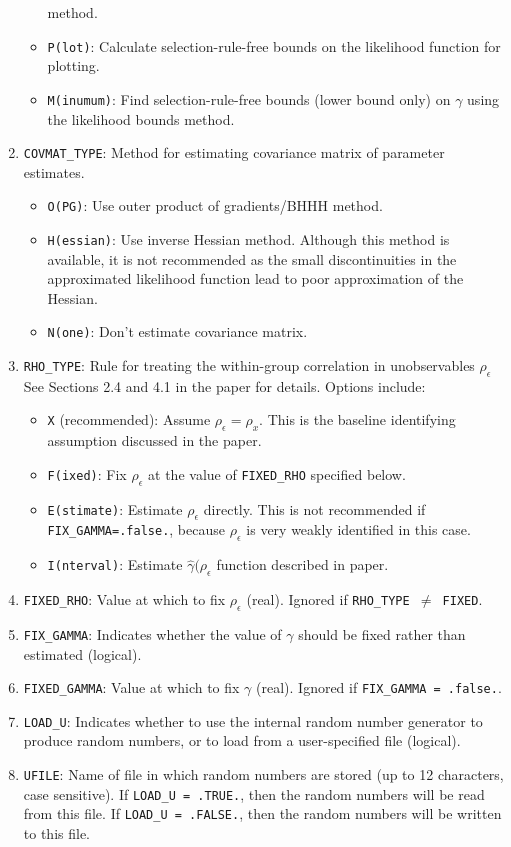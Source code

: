 \documentclass{article}
\begin{document}
\begin{enumerate}
\begin{itemize}
			method.
		\item {\tt P(lot)}: Calculate selection-rule-free bounds on the likelihood function for 
			plotting.
		\item {\tt M(inumum)}: Find selection-rule-free bounds (lower bound only) 
			on $\gamma$ using the likelihood bounds	method.
	\end{itemize}
\item {\tt COVMAT\_TYPE}: Method for estimating covariance matrix of parameter estimates.
	\begin{itemize}
		\item {\tt O(PG)}: Use outer product of gradients/BHHH method.
		\item {\tt H(essian)}: Use inverse Hessian method.  Although this method is available,
			it is not recommended as the small discontinuities in the approximated likelihood function 
			lead to poor approximation of the Hessian.
		\item {\tt N(one)}: Don't estimate covariance matrix.
	\end{itemize}
\item {\tt RHO\_{}TYPE}: Rule for treating the within-group correlation in unobservables $\rho_{\epsilon}$
	See Sections 2.4 and 4.1 in the paper for details. Options include:
	\begin{itemize}
		\item {\tt X} (recommended): Assume $\rho_{\epsilon}=\rho_x$.  This is the baseline
			identifying assumption discussed in the paper.
		\item {\tt F(ixed)}: Fix $\rho_{\epsilon}$ at the value of {\tt FIXED\_RHO} specified below.
		\item {\tt E(stimate)}: Estimate $\rho_{\epsilon}$ directly.  This is not recommended if {\tt FIX\_GAMMA=.false.},
			because $\rho_{\epsilon}$ is very weakly identified in this case.
		\item {\tt I(nterval)}: Estimate $\hat{\gamma}(\rho_{\epsilon}$ function described in paper.
	\end{itemize}
\item {\tt FIXED\_RHO}: Value at which to fix $\rho_{\epsilon}$ (real).  Ignored if {\tt RHO\_TYPE $\neq$ FIXED}.
\item {\tt FIX\_GAMMA}: Indicates whether the value of $\gamma$ should be fixed rather than estimated (logical).
\item {\tt FIXED\_GAMMA}: Value at which to fix $\gamma$ (real).  Ignored if {\tt FIX\_GAMMA = .false.}.
\item {\tt LOAD\_{}U}: Indicates whether to use the internal random number generator to produce 
	random numbers, or to load from a user-specified file (logical).  
\item {\tt UFILE}: Name of file in which random numbers are stored (up to 12 characters, case sensitive).  
	If {\tt LOAD\_U = .TRUE.}, then the random numbers will be read from this file.  If 
	{\tt LOAD\_U = .FALSE.}, then the random numbers will be written to this file.
\end{enumerate}
\end{document}
